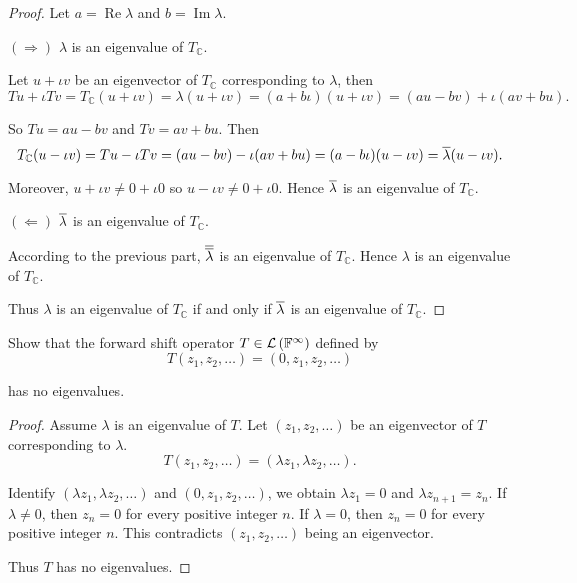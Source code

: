 \begin{proof}
    Let $a = \operatorname{Re}\lambda$ and $b = \operatorname{Im}\lambda$.

    $(\Rightarrow)$ $\lambda$ is an eigenvalue of $T_{\mathbb{C}}$.

    Let $u + \iota v$ be an eigenvector of $T_{\mathbb{C}}$ corresponding to $\lambda$, then
    \[
        Tu + \iota Tv = T_{\mathbb{C}}(u + \iota v) = \lambda (u + \iota v) = (a + b\iota)(u + \iota v) = (au - bv) + \iota(av + bu).
    \]

    So $Tu = au - bv$ and $Tv = av + bu$. Then
    \[
        T_{\mathbb{C}}(u - \iota v) = Tu - \iota Tv = (au - bv) - \iota (av + bu) = (a - b\iota)(u - \iota v) = \overline{\lambda}(u - \iota v).
    \]

    Moreover, $u + \iota v\ne 0 + \iota 0$ so $u - \iota v\ne 0 + \iota 0$. Hence $\overline{\lambda}$ is an eigenvalue of $T_{\mathbb{C}}$.

    $(\Leftarrow)$ $\overline{\lambda}$ is an eigenvalue of $T_{\mathbb{C}}$.

    According to the previous part, $\overline{\overline{\lambda}}$ is an eigenvalue of $T_{\mathbb{C}}$. Hence $\lambda$ is an eigenvalue of $T_{\mathbb{C}}$.

    \bigskip

    Thus $\lambda$ is an eigenvalue of $T_{\mathbb{C}}$ if and only if $\overline{\lambda}$ is an eigenvalue of $T_{\mathbb{C}}$.
\end{proof}
\newpage

\begin{exercise}
    Show that the forward shift operator $T\in\mathcal{L}\left({\mathbb{F}^{\infty}}\right)$ defined by
    \[
        T(z_{1}, z_{2}, \ldots) = (0, z_{1}, z_{2}, \ldots)
    \]

    has no eigenvalues.
\end{exercise}

\begin{proof}
    Assume $\lambda$ is an eigenvalue of $T$. Let $(z_{1}, z_{2}, \ldots)$ be an eigenvector of $T$ corresponding to $\lambda$.
    \[
        T(z_{1}, z_{2}, \ldots) = (\lambda z_{1}, \lambda z_{2}, \ldots).
    \]

    Identify $(\lambda z_{1}, \lambda z_{2}, \ldots)$ and $(0, z_{1}, z_{2}, \ldots)$, we obtain $\lambda z_{1} = 0$ and $\lambda z_{n+1} = z_{n}$. If $\lambda\ne 0$, then $z_{n} = 0$ for every positive integer $n$. If $\lambda = 0$, then $z_{n} = 0$ for every positive integer $n$. This contradicts $(z_{1}, z_{2}, \ldots)$ being an eigenvector.

    Thus $T$ has no eigenvalues.
\end{proof}
\newpage

